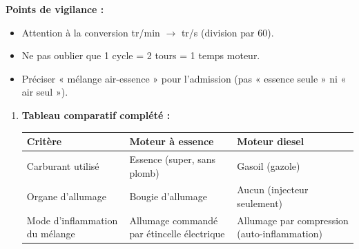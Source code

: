 \documentclass[11pt]{article}
\begin{document}
\begin{corrige}
\textbf{Points de vigilance :}
\begin{itemize}
\item Attention à la conversion tr/min $\rightarrow$ tr/s (division par 60).
\item Ne pas oublier que 1 cycle = 2 tours = 1 temps moteur.
\item Préciser « mélange air-essence » pour l'admission (pas « essence seule » ni « air seul »).
\end{itemize}
\end{corrige}

\begin{corrige}
\begin{enumerate}
\item \textbf{Tableau comparatif complété :}
\begin{center}
\begin{tabularx}{\linewidth}{|l|X|X|}
\hline
\rowcolor{popblueL} \textbf{Critère} & \textbf{Moteur à essence} & \textbf{Moteur diesel} \\
\hline
Carburant utilisé & Essence (super, sans plomb) & Gasoil (gazole) \\
\hline
Organe d'allumage & Bougie d'allumage & Aucun (injecteur seulement) \\
\hline
Mode d'inflammation du mélange & Allumage commandé par étincelle électrique & Allumage par compression (auto-inflammation) \\
\hline
\end{tabularx}
\end{center}


\end{enumerate}
\end{corrige}
\end{document}
